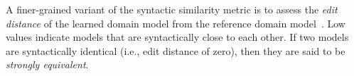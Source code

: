 \documentclass[letterpaper]{article} %
\newif\ifaddcomments
\newcommand{\roni}[1]{\ifaddcomments{\textcolor{red}{[Roni: #1]}}\fi}
\newcommand{\leo}[1]{\ifaddcomments{\textcolor{pink}{[Leonardo: #1]}}\fi}
\newtheorem{example}{Example}
\begin{document}

A finer-grained variant of the syntactic similarity metric is to assess the \emph{edit distance} of the learned domain model from the reference domain model~\cite{chrpa2023comparing}. Low values indicate models that are syntactically close to each other. If two models are syntactically identical (i.e., edit distance of zero), then they are said to be \textit{strongly equivalent}.





\end{document}
